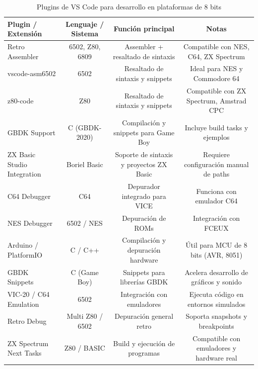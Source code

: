 \documentclass[../../main.tex]{subfiles}
\begin{document}
\begin{table}[!h]
    \caption{Plugins de VS Code para desarrollo en plataformas de 8 bits}
    \centering
    {
        \begin{tabular}{|l|c|c|c|}
            \hline
            \textbf{Plugin / Extensión} & \textbf{Lenguaje / Sistema} & \textbf{Función principal} & \textbf{Notas} \\
            \hline
            Retro Assembler & 6502, Z80, 6809 & Assembler + resaltado de sintaxis & Compatible con NES, C64, ZX Spectrum \\
            \hline
            vscode-asm6502 & 6502 & Resaltado de sintaxis y snippets & Ideal para NES y Commodore 64 \\
            \hline
            z80-code & Z80 & Resaltado de sintaxis y snippets & Compatible con ZX Spectrum, Amstrad CPC \\
            \hline
            GBDK Support & C (GBDK-2020) & Compilación y snippets para Game Boy & Incluye build tasks y ejemplos \\
            \hline
            ZX Basic Studio Integration & Boriel Basic & Soporte de sintaxis y proyectos ZX Basic & Requiere configuración manual de paths \\
            \hline
            C64 Debugger & C64 & Depurador integrado para VICE & Funciona con emulador C64 \\
            \hline
            NES Debugger & 6502 / NES & Depuración de ROMs & Integración con FCEUX \\
            \hline
            Arduino / PlatformIO & C / C++ & Compilación y depuración hardware & Útil para MCU de 8 bits (AVR, 8051) \\
            \hline
            GBDK Snippets & C (Game Boy) & Snippets para librerías GBDK & Acelera desarrollo de gráficos y sonido \\
            \hline
            VIC-20 / C64 Emulation & 6502 & Integración con emuladores & Ejecuta código en entornos simulados \\
            \hline
            Retro Debug & Multi Z80 / 6502 & Depuración general retro & Soporta snapshots y breakpoints \\
            \hline
            ZX Spectrum Next Tasks & Z80 / BASIC & Build y ejecución de programas & Compatible con emuladores y hardware real \\
            \hline
        \end{tabular}
    }
    \label{tab:vscode-plugins-8bit}
\end{table}
\end{document}
